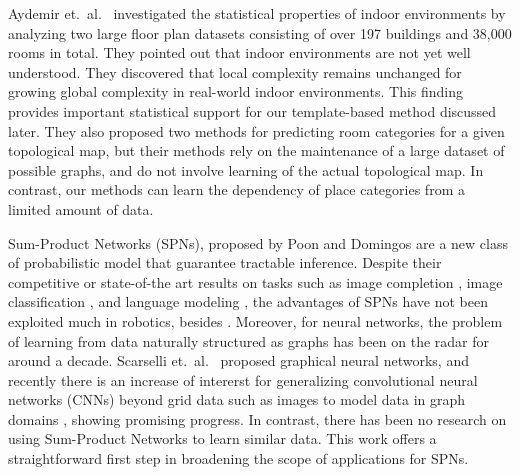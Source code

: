 \documentclass[10pt, titlepage]{article}
\theoremstyle{definition}
\begin{document}
Aydemir et.~al.~\cite{aydemir2012can} investigated the statistical properties of indoor environments by analyzing two large floor plan datasets consisting of over 197 buildings and 38,000 rooms in total. They pointed out that indoor environments are not yet well understood. They discovered that local complexity remains unchanged for growing global complexity in real-world indoor environments. This finding provides important statistical support for our template-based method discussed later. They also proposed two methods for predicting room categories for a given topological map, but their methods rely on the maintenance of a large dataset of possible graphs, and do not involve learning of the actual topological map. In contrast, our methods can learn the dependency of place categories from a limited amount of data.

Sum-Product Networks (SPNs), proposed by Poon and Domingos \cite{poon2011sum} are a new class of probabilistic model that guarantee tractable inference. Despite their competitive or state-of-the art results on tasks such as image completion \cite{poon2011sum}, image classification \cite{gens2012discriminative}, and language modeling \cite{cheng2014language}, the advantages of SPNs have not been exploited much in robotics, besides \cite{pronobis2016learning}. Moreover, for neural networks, the problem of learning from data naturally structured as graphs has been on the radar for around a decade. Scarselli et.~al.~\cite{scarselli2009graph} proposed graphical neural networks, and recently there is an increase of intererst for generalizing convolutional neural networks (CNNs) beyond grid data such as images to model data in graph domains \cite{defferrard2016convolutional}\cite{kipf2016semi}, showing promising progress. In contrast, there has been no research on using Sum-Product Networks to learn similar data. This work offers a straightforward first step in broadening the scope of applications for SPNs.
\end{document}
